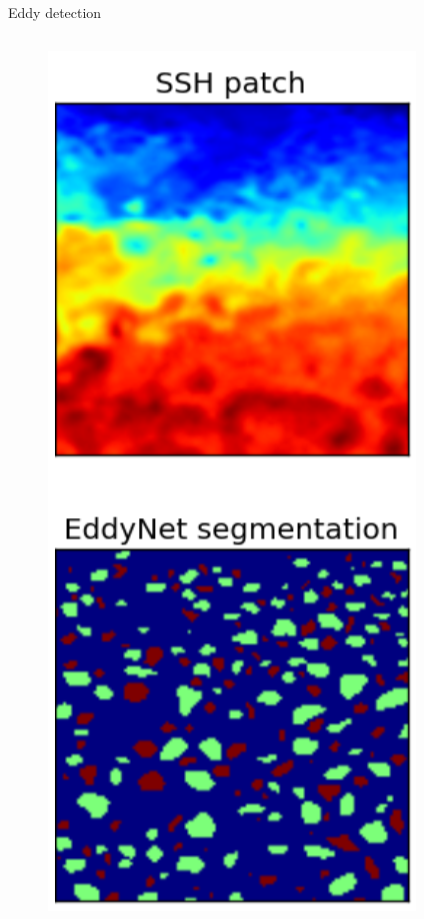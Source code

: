 \documentclass[handout]{beamer}
\begin{document}
\begin{frame}[t]{Eddy detection}
\begin{columns}
    \pause
         \begin{figure}
        \centering
         \includegraphics[width=.7\textwidth]{fig/L3/eddynet-result.png}
    \end{figure}
    \end{columns}
\end{frame}
\end{document}
